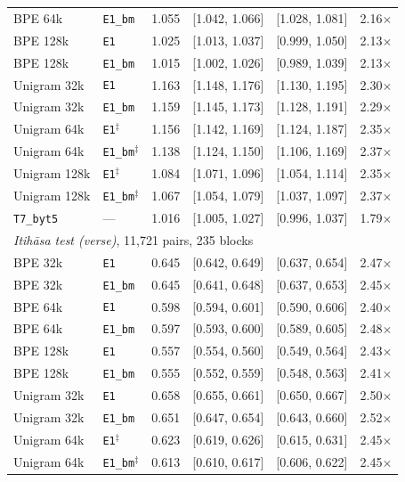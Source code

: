 \begin{table}[t]
\begin{tabular}{llrrrr}
BPE 64k & \texttt{E1\_bm} & 1.055 & [1.042, 1.066] & [1.028, 1.081] & 2.16$\times$ \\
BPE 128k & \texttt{E1} & 1.025 & [1.013, 1.037] & [0.999, 1.050] & 2.13$\times$ \\
BPE 128k & \texttt{E1\_bm} & 1.015 & [1.002, 1.026] & [0.989, 1.039] & 2.13$\times$ \\
Unigram 32k & \texttt{E1} & 1.163 & [1.148, 1.176] & [1.130, 1.195] & 2.30$\times$ \\
Unigram 32k & \texttt{E1\_bm} & 1.159 & [1.145, 1.173] & [1.128, 1.191] & 2.29$\times$ \\
Unigram 64k & \texttt{E1}$^{\ddagger}$ & 1.156 & [1.142, 1.169] & [1.124, 1.187] & 2.35$\times$ \\
Unigram 64k & \texttt{E1\_bm}$^{\ddagger}$ & 1.138 & [1.124, 1.150] & [1.106, 1.169] & 2.37$\times$ \\
Unigram 128k & \texttt{E1}$^{\ddagger}$ & 1.084 & [1.071, 1.096] & [1.054, 1.114] & 2.35$\times$ \\
Unigram 128k & \texttt{E1\_bm}$^{\ddagger}$ & 1.067 & [1.054, 1.079] & [1.037, 1.097] & 2.37$\times$ \\
\texttt{T7\_byt5} & --- & 1.016 & [1.005, 1.027] & [0.996, 1.037] & 1.79$\times$ \\
\midrule
\multicolumn{6}{l}{\emph{Itih\=asa test (verse)}, 11,721 pairs, 235 blocks} \\
BPE 32k & \texttt{E1} & 0.645 & [0.642, 0.649] & [0.637, 0.654] & 2.47$\times$ \\
BPE 32k & \texttt{E1\_bm} & 0.645 & [0.641, 0.648] & [0.637, 0.653] & 2.45$\times$ \\
BPE 64k & \texttt{E1} & 0.598 & [0.594, 0.601] & [0.590, 0.606] & 2.40$\times$ \\
BPE 64k & \texttt{E1\_bm} & 0.597 & [0.593, 0.600] & [0.589, 0.605] & 2.48$\times$ \\
BPE 128k & \texttt{E1} & 0.557 & [0.554, 0.560] & [0.549, 0.564] & 2.43$\times$ \\
BPE 128k & \texttt{E1\_bm} & 0.555 & [0.552, 0.559] & [0.548, 0.563] & 2.41$\times$ \\
Unigram 32k & \texttt{E1} & 0.658 & [0.655, 0.661] & [0.650, 0.667] & 2.50$\times$ \\
Unigram 32k & \texttt{E1\_bm} & 0.651 & [0.647, 0.654] & [0.643, 0.660] & 2.52$\times$ \\
Unigram 64k & \texttt{E1}$^{\ddagger}$ & 0.623 & [0.619, 0.626] & [0.615, 0.631] & 2.45$\times$ \\
Unigram 64k & \texttt{E1\_bm}$^{\ddagger}$ & 0.613 & [0.610, 0.617] & [0.606, 0.622] & 2.45$\times$ \\

\end{tabular}
\end{table}
